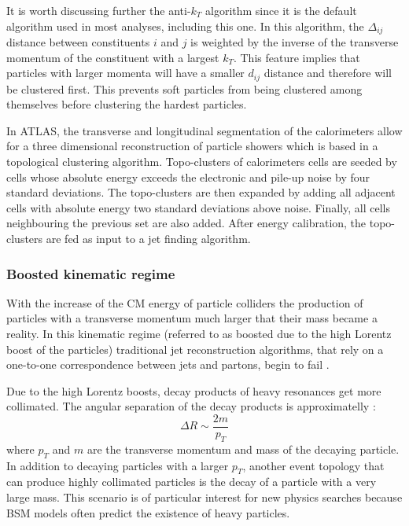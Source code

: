 It is worth discussing further the anti-$k_T$ algorithm since it is the default algorithm used in most analyses, including this one. In this algorithm, the $\Delta_{ij}$ distance between constituents $i$ and $j$ is weighted by the inverse of the transverse momentum of the constituent with a largest $k_T$. This feature implies that particles with larger momenta will have a smaller $d_{ij}$ distance and therefore will be clustered first. This prevents soft particles from being clustered among themselves before clustering the hardest particles.

In ATLAS, the transverse and longitudinal segmentation of the calorimeters allow for a three dimensional reconstruction of particle showers which is based in a topological clustering algorithm. Topo-clusters of calorimeters cells are seeded by cells whose absolute energy exceeds the electronic and pile-up noise by four standard deviations. The topo-clusters are then expanded by adding all adjacent cells with absolute energy two standard deviations above noise. Finally, all cells neighbouring the previous set are also added. After energy calibration, the topo-clusters are fed as input to a jet finding algorithm.  

\subsubsection{Boosted kinematic regime}

With the increase of the CM energy of particle colliders the production of particles with a transverse momentum much larger that their mass became a reality. In this kinematic regime (referred to as boosted due to the high Lorentz boost of the particles) traditional jet reconstruction algorithms, that rely on a one-to-one correspondence between jets and partons, begin to fail \cite{jetsubLHC}. 

Due to the high Lorentz boosts, decay products of heavy resonances get more collimated. The angular separation of the decay products is approximatelly \cite{jetsub}:
\begin{equation}
	\Delta R \sim \frac{2 m}{p_T}
	\label{eq:deltaR}
\end{equation}
where $p_T$ and $m$ are the transverse momentum and mass of the decaying particle. In addition to decaying particles with a larger $p_T$, another event topology that can produce highly collimated particles is the decay of a particle with a very large mass. This scenario is of particular interest for new physics searches because BSM models often predict the existence of heavy particles. 


